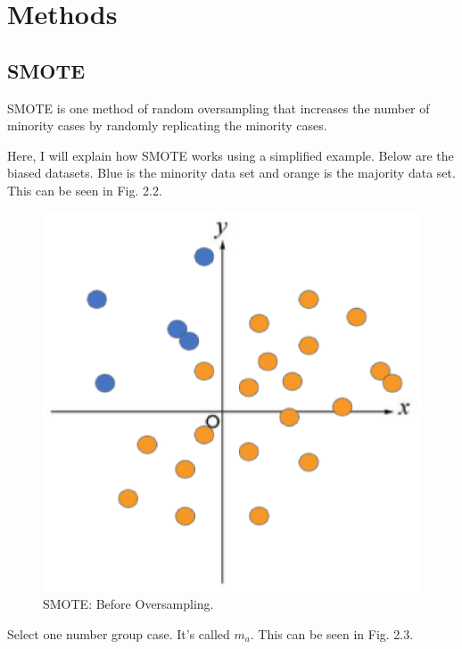 \section{Methods}
\subsection{SMOTE}
SMOTE is one method of random oversampling that increases the number of minority cases by randomly replicating the minority cases\cite{SMOTE}.

Here, I will explain how SMOTE works using a simplified example. Below are the biased datasets. Blue is the minority data set and orange is the majority data set. This can be seen in Fig. 2.2.

\begin{center}
    \begin{figure}[ht]
        \caption{SMOTE: Before Oversampling.}
        \label{tab:team-rating-features}
        \begin{center}
            \includegraphics[scale=0.6]{image/smote1.eps}
        \end{center}
    \end{figure}
\end{center}

\clearpage

Select one number group case. It's called $m_a$. This can be seen in Fig. 2.3.


